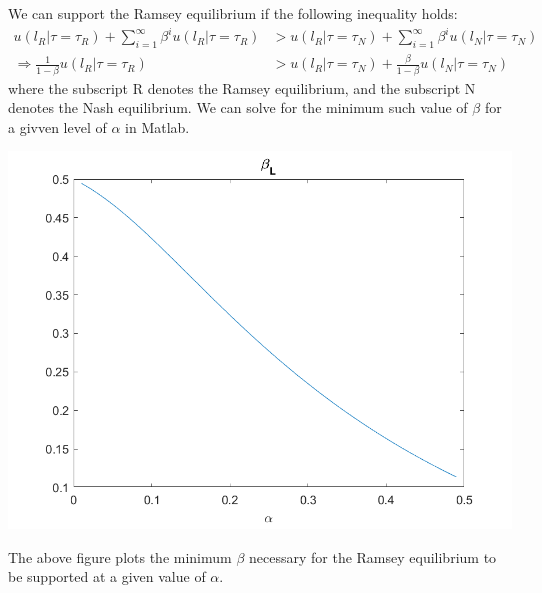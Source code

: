 \documentclass[11pt]{article} %
\begin{document}
We can support the Ramsey equilibrium if the following inequality holds:
\begin{align*}
u(l_R|\tau = \tau_R) + \sum_{i=1}^{\infty} \beta^i u(l_R|\tau=\tau_R)&>u(l_R|\tau = \tau_N) + \sum_{i=1}^{\infty} \beta^i u(l_N|\tau=\tau_N)\\
\Rightarrow \frac{1}{1-\beta}u(l_R|\tau = \tau_R)  &> u(l_R|\tau = \tau_N) + \frac{\beta}{1-\beta}u(l_N|\tau=\tau_N)
\end{align*}
where the subscript R denotes the Ramsey equilibrium, and the subscript N denotes the Nash equilibrium. We can solve for the minimum such value of $\beta$ for a givven level of $\alpha$ in Matlab.

\includegraphics{beta}

The above figure plots the minimum $\beta$ necessary for the Ramsey equilibrium to be supported at a given value of $\alpha$.
\end{document}
